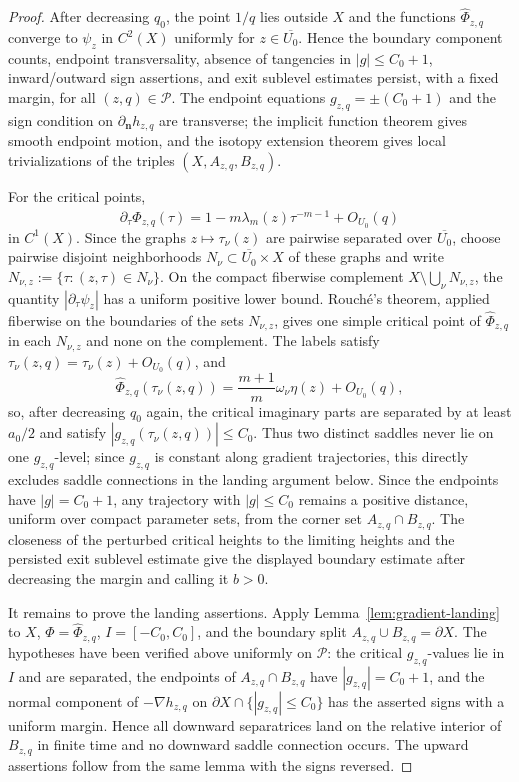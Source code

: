 \documentclass[reqno]{article}
\theoremstyle{definition}
\theoremstyle{remark}
\theoremstyle{plain}
\begin{document}
\begin{proof}
After decreasing $q_0$, the point $1/q$ lies outside $X$ and the functions $\widehat\Phi_{z,q}$ converge to $\psi_z$ in $C^2(X)$ uniformly for $z\in\overline{U_0}$. Hence the boundary component counts, endpoint transversality, absence of tangencies in $|g|\le C_0+1$, inward/outward sign assertions, and exit sublevel estimates persist, with a fixed margin, for all $(z,q)\in\mathcal P$. The endpoint equations $g_{z,q}=\pm(C_0+1)$ and the sign condition on $\partial_{\mathbf n}h_{z,q}$ are transverse; the implicit function theorem gives smooth endpoint motion, and the isotopy extension theorem gives local trivializations of the triples $(X,A_{z,q},B_{z,q})$.

For the critical points,
$$\partial_\tau\widehat\Phi_{z,q}(\tau)=1-m\lambda_m(z)\tau^{-m-1}+O_{U_0}(q)$$
in $C^1(X)$. Since the graphs $z\mapsto\tau_\nu(z)$ are pairwise separated over $\overline{U_0}$, choose pairwise disjoint neighborhoods $N_\nu\subset\overline{U_0}\times X$ of these graphs and write $N_{\nu,z}:=\{\tau:(z,\tau)\in N_\nu\}$. On the compact fiberwise complement $X\setminus\bigcup_\nu N_{\nu,z}$, the quantity $|\partial_\tau\psi_z|$ has a uniform positive lower bound. Rouch\'e's theorem, applied fiberwise on the boundaries of the sets $N_{\nu,z}$, gives one simple critical point of $\widehat\Phi_{z,q}$ in each $N_{\nu,z}$ and none on the complement. The labels satisfy $\tau_\nu(z,q)=\tau_\nu(z)+O_{U_0}(q)$, and
$$\widehat\Phi_{z,q}(\tau_\nu(z,q))=\frac{m+1}{m}\omega_\nu\eta(z)+O_{U_0}(q),$$
so, after decreasing $q_0$ again, the critical imaginary parts are separated by at least $a_0/2$ and satisfy $|g_{z,q}(\tau_\nu(z,q))|\le C_0$. Thus two distinct saddles never lie on one $g_{z,q}$-level; since $g_{z,q}$ is constant along gradient trajectories, this directly excludes saddle connections in the landing argument below. Since the endpoints have $|g|=C_0+1$, any trajectory with $|g|\le C_0$ remains a positive distance, uniform over compact parameter sets, from the corner set $A_{z,q}\cap B_{z,q}$. The closeness of the perturbed critical heights to the limiting heights and the persisted exit sublevel estimate give the displayed boundary estimate after decreasing the margin and calling it $b>0$.

It remains to prove the landing assertions. Apply Lemma~\ref{lem:gradient-landing} to $X$, $\Phi=\widehat\Phi_{z,q}$, $I=[-C_0,C_0]$, and the boundary split $A_{z,q}\cup B_{z,q}=\partial X$. The hypotheses have been verified above uniformly on $\mathcal P$: the critical $g_{z,q}$-values lie in $I$ and are separated, the endpoints of $A_{z,q}\cap B_{z,q}$ have $|g_{z,q}|=C_0+1$, and the normal component of $-\nabla h_{z,q}$ on $\partial X\cap\{|g_{z,q}|\le C_0\}$ has the asserted signs with a uniform margin. Hence all downward separatrices land on the relative interior of $B_{z,q}$ in finite time and no downward saddle connection occurs. The upward assertions follow from the same lemma with the signs reversed.
\end{proof}
\end{document}

